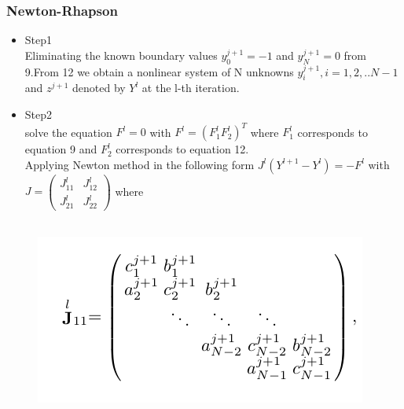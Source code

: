 \documentclass{beamer}
\begin{document}
\begin{frame}
\frametitle{Newton-Rhapson}
    \begin{itemize}
    \item<1-> Step1\\
Eliminating the known boundary values $y_{0}^{j+1}=-1$ and $y_{N}^{j+1}=0$ from 9.From 12 we obtain a nonlinear system of N unknowns $y_{i}^{j+1}, i=1,2,..N-1$ and $z^{j+1}$ denoted by $Y^{l}$ at the l-th iteration.
\item<1-> Step2\\
solve the equation $F^{l}=0$ with $F^{l}=(F_{1}^{l} F_{2}^{l})^{T}$ where $F_{1}^{l}$ corresponds to equation 9 and $F_{2}^{l}$ corresponds to equation 12.\\
Applying Newton method in the following form $J^{l}(Y^{l+1}-Y^{l})=-F^{l}$ with $J=\begin{pmatrix}
J_{11}^l & J_{12}^l\\
J_{21}^{l} & J_{22}^l
\end{pmatrix}$ where\\
\\



\end{itemize}



\end{frame}
\begin{frame}

\begin{figure}[!htb]
	\centering 
	\includegraphics[width=0.7\linewidth]{j11.png}
	
\end{figure}
\end{frame}
\end{document}
